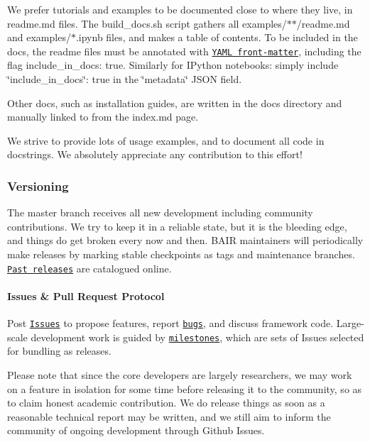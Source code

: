 We prefer tutorials and examples to be documented close to where they live, in {\ttfamily readme.\+md} files. The {\ttfamily build\+\_\+docs.\+sh} script gathers all {\ttfamily examples/$\ast$$\ast$/readme.md} and {\ttfamily examples/$\ast$.ipynb} files, and makes a table of contents. To be included in the docs, the readme files must be annotated with \href{http://jekyllrb.com/docs/frontmatter/}{\tt Y\+A\+ML front-\/matter}, including the flag {\ttfamily include\+\_\+in\+\_\+docs\+: true}. Similarly for I\+Python notebooks\+: simply include {\ttfamily \char`\"{}include\+\_\+in\+\_\+docs\char`\"{}\+: true} in the {\ttfamily \char`\"{}metadata\char`\"{}} J\+S\+ON field.

Other docs, such as installation guides, are written in the {\ttfamily docs} directory and manually linked to from the {\ttfamily index.\+md} page.

We strive to provide lots of usage examples, and to document all code in docstrings. We absolutely appreciate any contribution to this effort!

\subsubsection*{Versioning}

The {\ttfamily master} branch receives all new development including community contributions. We try to keep it in a reliable state, but it is the bleeding edge, and things do get broken every now and then. B\+A\+IR maintainers will periodically make releases by marking stable checkpoints as tags and maintenance branches. \href{https://github.com/BVLC/caffe/releases}{\tt Past releases} are catalogued online.

\paragraph*{Issues \& Pull Request Protocol}

Post \href{https://github.com/BVLC/caffe/issues}{\tt Issues} to propose features, report \href{https://github.com/BVLC/caffe/issues?labels=bug&page=1&state=open}{\tt bugs}, and discuss framework code. Large-\/scale development work is guided by \href{https://github.com/BVLC/caffe/issues?milestone=1}{\tt milestones}, which are sets of Issues selected for bundling as releases.

Please note that since the core developers are largely researchers, we may work on a feature in isolation for some time before releasing it to the community, so as to claim honest academic contribution. We do release things as soon as a reasonable technical report may be written, and we still aim to inform the community of ongoing development through Github Issues.

